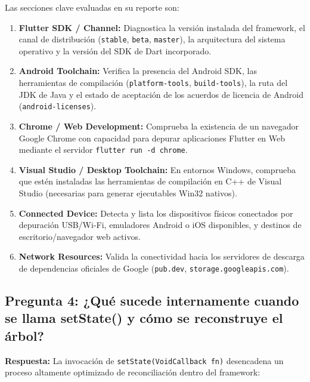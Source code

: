 \documentclass[12pt,a4paper]{article}
\begin{document}
Las secciones clave evaluadas en su reporte son:
\begin{enumerate}
    \item \textbf{Flutter SDK / Channel:} Diagnostica la versión instalada del framework, el canal de distribución (\texttt{stable}, \texttt{beta}, \texttt{master}), la arquitectura del sistema operativo y la versión del SDK de Dart incorporado.
    \item \textbf{Android Toolchain:} Verifica la presencia del Android SDK, las herramientas de compilación (\texttt{platform-tools}, \texttt{build-tools}), la ruta del JDK de Java y el estado de aceptación de los acuerdos de licencia de Android (\texttt{android-licenses}).
    \item \textbf{Chrome / Web Development:} Comprueba la existencia de un navegador Google Chrome con capacidad para depurar aplicaciones Flutter en Web mediante el servidor \texttt{flutter run -d chrome}.
    \item \textbf{Visual Studio / Desktop Toolchain:} En entornos Windows, comprueba que estén instaladas las herramientas de compilación en C++ de Visual Studio (necesarias para generar ejecutables Win32 nativos).
    \item \textbf{Connected Device:} Detecta y lista los dispositivos físicos conectados por depuración USB/Wi-Fi, emuladores Android o iOS disponibles, y destinos de escritorio/navegador web activos.
    \item \textbf{Network Resources:} Valida la conectividad hacia los servidores de descarga de dependencias oficiales de Google (\texttt{pub.dev}, \texttt{storage.googleapis.com}).
\end{enumerate}

\subsection{Pregunta 4: ¿Qué sucede internamente cuando se llama setState() y cómo se reconstruye el árbol?}
\textbf{Respuesta:}
La invocación de \texttt{setState(VoidCallback fn)} desencadena un proceso altamente optimizado de reconciliación dentro del framework:
\end{document}
